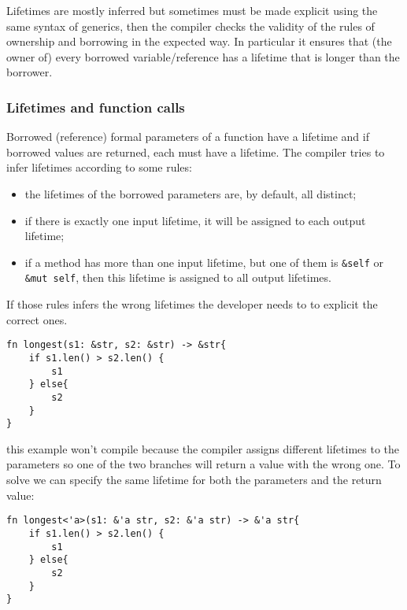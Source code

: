 Lifetimes are mostly inferred but sometimes must be made explicit using the same syntax of generics, then the compiler checks the validity of the rules of ownership and borrowing in the expected way.
In particular it ensures that (the owner of) every borrowed variable/reference has a lifetime that is longer than the borrower.

\subsubsection{Lifetimes and function calls}
Borrowed (reference) formal parameters of a function have a lifetime and if borrowed values are returned, each must have a lifetime.
The compiler tries to infer lifetimes according to some rules:
\begin{itemize}
    \item the lifetimes of the borrowed parameters are, by default, all distinct;
    \item if there is exactly one input lifetime, it will be assigned to each output lifetime;
    \item if a method has more than one input lifetime, but one of them is \verb|&self| or \verb|&mut self|, then this lifetime is assigned to all output lifetimes.
\end{itemize}
If those rules infers the wrong lifetimes the developer needs to to explicit the correct ones.

\begin{verbatim}
fn longest(s1: &str, s2: &str) -> &str{
    if s1.len() > s2.len() {
        s1
    } else{
        s2
    }
}
\end{verbatim}
this example won't compile because the compiler assigns different lifetimes to the parameters so one of the two branches will return a value with the wrong one.
To solve we can specify the same lifetime for both the parameters and the return value:
\begin{verbatim}
fn longest<'a>(s1: &'a str, s2: &'a str) -> &'a str{
    if s1.len() > s2.len() {
        s1
    } else{
        s2
    }
}
\end{verbatim}


